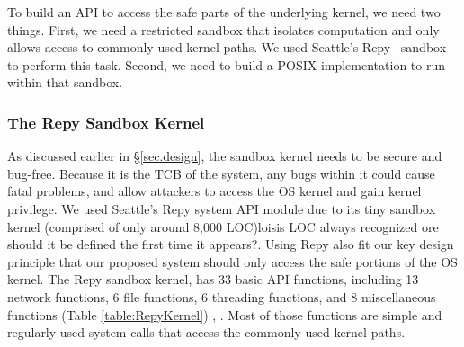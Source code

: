 To build an API to access the safe parts of the underlying kernel, we need
two things.  First, we need a restricted sandbox that isolates computation
and only allows access to commonly used kernel paths.  We used
Seattle's Repy~\cite{Repy-10} sandbox to perform this task.
Second, we need to build a POSIX implementation to run within that sandbox.


\subsubsection{The Repy Sandbox Kernel}

As discussed earlier in \S{\ref{sec.design}}, the sandbox kernel needs to be secure and bug-free.
Because it is the TCB of the system, any bugs within it could cause fatal problems,
and allow attackers to access the OS kernel and gain kernel privilege.
We used Seattle's Repy system API module due to its tiny sandbox kernel
(comprised of only around 8,000 LOC)lois{is LOC always recognized ore should it be defined the
first time it appears?}. Using Repy also fit our key design principle that
our proposed system should only access the safe portions of the OS kernel.
The Repy sandbox kernel, has 33 basic API functions, including 13 network functions,
6 file functions, 6 threading functions,
and 8 miscellaneous functions
 (Table \ref{table:RepyKernel}) \cite{Repy-10}, \cite{RepyKernel}. Most of those functions are simple and
regularly used system calls that access the commonly used kernel paths.


